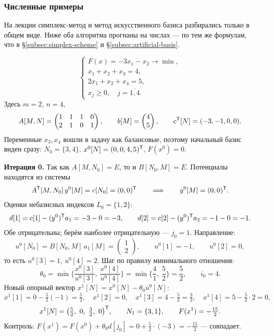 \subsubsection*{Численные примеры}

\begin{idea}[title={Откуда этот материал}]
На лекции симплекс-метод и метод искусственного базиса разбирались только в
общем виде. Ниже оба алгоритма прогнаны на числах — по тем же формулам, что в
\S\ref{subsec:simplex-scheme} и \S\ref{subsec:artificial-basis}.
\end{idea}

\begin{example}\label{ex:simplex-run}
\[
  \begin{cases}
    F(x) = -3x_1 - x_2 \to \min , \\
    x_1 + x_2 + x_3 = 4 , \\
    2x_1 + x_2 + x_4 = 5 , \\
    x_j \ge 0 , \quad j = \overline{1,4} .
  \end{cases}
\]
Здесь $m = 2$, $n = 4$,
\[
  A[M,N] = \begin{pmatrix} 1 & 1 & 1 & 0 \\ 2 & 1 & 0 & 1 \end{pmatrix} ,
  \qquad
  b[M] = \begin{pmatrix} 4 \\ 5 \end{pmatrix} ,
  \qquad
  c^{\mathsf{T}}[N] = (-3, -1, 0, 0) .
\]
Переменные $x_3, x_4$ вошли в задачу как балансовые, поэтому начальный базис
виден сразу: $N_0 = \{3, 4\}$, $x^0[N] = (0, 0, 4, 5)^{\mathsf{T}}$, $F(x^0) = 0$.

\medskip
\noindent\textbf{Итерация 0.} Так как $A[M,N_0] = E$, то и $B[N_0,M] = E$.
Потенциалы находятся из системы
\[
  A^{\mathsf{T}}[M,N_0]\,y^0[M] = c[N_0] = (0,0)^{\mathsf{T}}
  \qquad\Longrightarrow\qquad
  y^0[M] = (0,0)^{\mathsf{T}} .
\]
Оценки небазисных индексов $L_0 = \{1,2\}$:
\[
  d[1] = c[1] - (y^0)^{\mathsf{T}} a_1 = -3 - 0 = -3 , \qquad
  d[2] = c[2] - (y^0)^{\mathsf{T}} a_2 = -1 - 0 = -1 .
\]
Обе отрицательны; берём наиболее отрицательную — $j_0 = 1$. Направление:
\[
  u^0[N_0] = B[N_0,M]\,a_1[M] = \begin{pmatrix} 1 \\ 2 \end{pmatrix} ,
  \qquad u^0[1] = -1 , \qquad u^0[2] = 0 ,
\]
то есть $u^0[3] = 1$, $u^0[4] = 2$. Шаг по правилу минимального отношения:
\[
  \theta_0 = \min\Big\{ \frac{x^0[3]}{u^0[3]},\ \frac{x^0[4]}{u^0[4]} \Big\}
           = \min\Big\{ \frac{4}{1},\ \frac{5}{2} \Big\} = \frac52 ,
  \qquad i_0 = 4 .
\]
Новый опорный вектор $x^1[N] = x^0[N] - \theta_0 u^0[N]$:
\[
  x^1[1] = 0 - \tfrac52(-1) = \tfrac52 , \quad
  x^1[2] = 0 , \quad
  x^1[3] = 4 - \tfrac52 = \tfrac32 , \quad
  x^1[4] = 5 - \tfrac52\cdot 2 = 0 ,
\]
\[
  x^1[N] = \big(\tfrac52,\ 0,\ \tfrac32,\ 0\big)\T ,
  \qquad N_1 = \{3, 1\} ,
  \qquad F(x^1) = -\tfrac{15}{2} .
\]
Контроль: $F(x^1) = F(x^0) + \theta_0 d[j_0] = 0 + \tfrac52 \cdot (-3)
= -\tfrac{15}{2}$ — совпадает.


\end{example}
